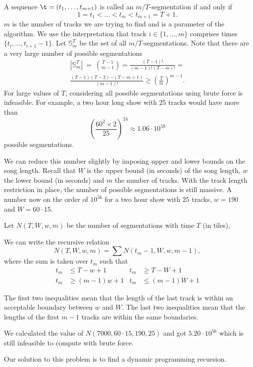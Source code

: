 \documentclass[twocolumn]{article}
\newcommand{\segs}{\mathbb S}
\begin{document}
	A sequence $\t = (t_1, \ldots, t_{m+1})$ is called an $m/T$-segmentation if and only if
	\[
	1 = t_1 < \ldots < t_m < t_{m+1} = T+1.
	\]
	$m$ is the number of tracks we are trying to find and is a parameter of the algorithm. We use the interpretation that track $i \in \{1, \ldots, m\}$ comprises times $\{t_i, \ldots, t_{i+1}-1\}$. Let $\segs^T_m$ be the set of all $m/T$-segmentations. Note that there are a very large number of possible segmentations 
	\begin{multline*}
		|\segs^T_m| ~=~ \binom{T-1}{m-1}
		= \frac{(T-1)!}{(m-1)!(T-m)!} =\\
		\frac{(T-1)(T-2)\cdots(T-m+1)}{(m-1)!} \ge \left( \frac{T}{m}\right)^{m-1}.
	\end{multline*} 
	For large values of $T$, considering all possible segmentations using brute force is infeasible. For example, a two hour long show with $25$ tracks would have more than 
	\[
	\left( \frac{60^2 \times 2}{25}\right)^{24}  \approx 1.06 \cdot 10^{59}
	\] possible segmentations. 
	
	We can reduce this number slightly by imposing upper and lower bounds on the song length.  Recall that $W$ is the upper bound (in seconds) of the song length, $w$ the lower bound (in seconds) and $m$ the number of tracks. With the track length restriction in place, the number of possible segmentations is still massive. A number now on the order of $10^{56}$ for a two hour show with $25$ tracks, $w=190$ and $W=60\cdot15$.
	
	Let $N(T,W,w,m)$ be the number of segmentations with time $T$ (in tiles),
	
	We can write the recursive relation $$N(T,W,w,m) = \sum N(t_m-1,W,w,m-1),$$ where the sum is taken over $t_m$ such that 
	\begin{align*}
		t_m &\le T-w+1 & t_m &\ge T-W+1\\
		t_m &\ge (m-1)w+1 & t_m &\le (m-1)W+1
	\end{align*}
	
	The first two inequalities mean that the length of the last track is within an acceptable boundary between $w$ and $W$. The last two inequalities mean that the lengths of the first $m-1$ tracks are within the same boundaries. 
	
	We calculated the value of $N(7000,60\cdot15,190,25)$ and got $5.20 \cdot 10^{56}$ which is still infeasible to compute with brute force.
	
	Our solution to this problem is to find a dynamic programming recursion.
	
\end{document}

